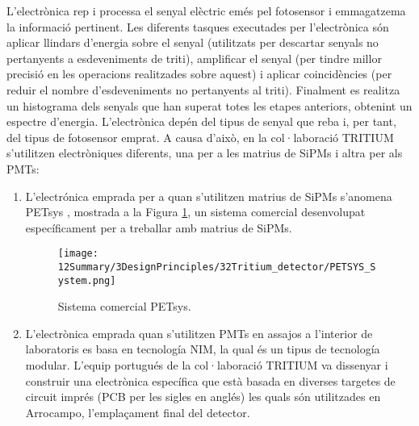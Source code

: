 L'electrònica rep i processa el senyal elèctric emés pel fotosensor i emmagatzema la informació pertinent. Les diferents tasques executades per l'electrònica són aplicar llindars d'energia sobre el senyal (utilitzats per descartar senyals no pertanyents a esdeveniments de triti), amplificar el senyal (per tindre millor precisió en les operacions realitzades sobre aquest) i aplicar coincidències (per reduir el nombre d'esdeveniments no pertanyents al triti). Finalment es realitza un histograma dels senyals que han superat totes les etapes anteriors, obtenint un espectre d'energia. L'electrònica depén del tipus de senyal que reba i, per tant, del tipus de fotosensor emprat. A causa d'això, en la col·laboració TRITIUM s'utilitzen electròniques diferents, una per a les matrius de SiPMs i altra per als PMTs:

\begin{enumerate}

\item{} L'electrónica emprada per a quan s'utilitzen matrius de SiPMs s'anomena PETsys \cite{PETSYS}, mostrada a la Figura \ref{fig:PETSYSs}, un sistema comercial desenvolupat específicament per a treballar amb matrius de SiPMs. 

\begin{figure}[h]
\texttt{[image: 12Summary/3DesignPrinciples/32Tritium\_detector/PETSYS\_System.png]}
\centering
\caption{Sistema comercial PETsys\label{fig:PETSYSs}.}
\end{figure}

\item{} L'electrònica emprada quan s'utilitzen PMTs en assajos a l'interior de laboratoris es basa en tecnología NIM, la qual és un tipus de tecnología modular. L'equip portugués de la col·laboració TRITIUM va dissenyar i construir una electrònica específica que està basada en diverses targetes de circuit imprés (PCB per les sigles en anglés) les quals són utilitzades en Arrocampo, l'emplaçament final del detector.

\end{enumerate}